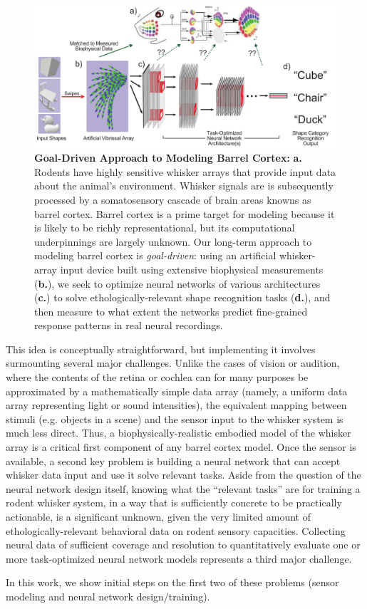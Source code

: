 \begin{figure}
\centering
\includegraphics [width=1\linewidth]{figures/schematic.pdf}
\vspace{-2mm}
\caption{\textbf{Goal-Driven Approach to Modeling Barrel Cortex:} \textbf{a.} Rodents have highly sensitive whisker arrays that provide input data about the animal's environment.  Whisker signals are is subsequently processed by a somatosensory cascade of brain areas knowns as barrel cortex. Barrel cortex is a prime target for modeling because it is likely to be richly representational, but its computational underpinnings are largely unknown. Our long-term approach to modeling barrel cortex is \emph{goal-driven}: using an artificial whisker-array input device built using extensive biophysical measurements (\textbf{b.}), we seek to optimize neural networks of various architectures (\textbf{c.}) to solve ethologically-relevant shape recognition tasks (\textbf{d.}), and then measure to what extent the networks predict fine-grained response patterns in real neural recordings. ~\label{fig_schematic}}
\end{figure}

This idea is conceptually straightforward, but implementing it involves surmounting several major challenges.  
Unlike the cases of vision or audition, where the contents of the retina or cochlea can for many purposes be approximated by a mathematically simple data array (namely, a uniform data array representing light or sound intensities), the equivalent mapping between stimuli (e.g. objects in a scene) and the sensor input to the whisker system is much less direct.   
Thus, a biophysically-realistic embodied model of the whisker array is a critical first component of any barrel cortex model.
Once the sensor is available, a second key problem is building a neural network that can accept whisker data input and use it solve relevant tasks. 
Aside from the question of the neural network design itself, knowing what the ``relevant tasks'' are for training a rodent whisker system, in a way that is sufficiently concrete to be practically actionable, is a significant unknown, given the very limited amount of ethologically-relevant behavioral data on rodent sensory capacities\cite{von2007neuronal, Knutsen2006, OConnor2010, Arabzadeh2005, Diamond2008}.
Collecting neural data of sufficient coverage and resolution to quantitatively evaluate one or more task-optimized neural network models represents a third major challenge.   

In this work, we show initial steps on the first two of these problems (sensor modeling and neural network design/training). 



